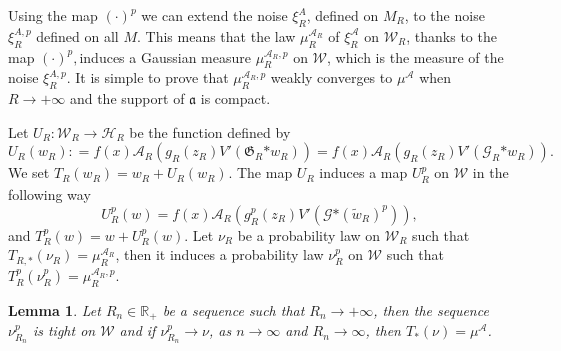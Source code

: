 \documentclass[a4paper,10pt]{article}
\newcommand{\asterisk}{\mathord{*}}
\newtheorem{lemma}{Lemma}
\begin{document}
Using the map $(\cdot)^p$ we can extend the noise $\xi^A_R$, defined on
$M_R$, to the noise $\xi^{A, p}_R$ defined on all $M$. This means that the law
$\mu^{\mathcal{A}_R}_R$ of $\xi^{\mathcal{A}}_R$ on $\mathcal{W}_R$, thanks to
the map $(\cdot)^p,$induces a Gaussian measure $\mu^{\mathcal{A}_R, p}_R$ on
$\mathcal{W}$, which is the measure of the noise $\xi^{A, p}_R$. It is simple
to prove that $\mu^{\mathcal{A}_R, p}_R$ weakly converges to
$\mu^{\mathcal{A}}$ when $R \rightarrow + \infty$ and the support of
$\mathfrak{a}$ is compact.

Let $U_R : \mathcal{W}_R \rightarrow \mathcal{H}_R$ be the function defined
by
\[ U_R (w_R) : = f (x) \mathcal{A}_R (g_R (z_R) V' (\mathfrak{G}_R \asterisk
   w_R)) = f (x) \mathcal{A}_R (g_R (z_R) V' (\mathcal{G}_R \asterisk w_R)) .
\]
We set $T_R (w_R) = w_R + U_R (w_R)_{}$. The map $U_R$ induces a map $U_R^p$
on $\mathcal{W}$ in the following way
\[ U_R^p (w) = f (x) \mathcal{A}_R (g_R^p (z_R) V' (\mathcal{G} \asterisk
   (\tilde{w}_R)^p)), \]
and $T^p_R (w) = w + U^p_R (w)$. Let $\nu_R$ be a probability law on
$\mathcal{W}_R$ such that $T_{R, \asterisk} (\nu_R) = \mu^{\mathcal{A}_R}_R$,
then it induces a probability law $\nu^p_R$ on $\mathcal{W}$ such that $T^p_R
(\nu_R^p) = \mu^{\mathcal{A}_R, p}_R$.

\begin{lemma}
  \label{lemma_extension1}Let $R_n \in \mathbb{R}_+$ be a sequence such that
  $R_n \rightarrow + \infty$, then the sequence $\nu_{R_n}^p$ is tight on
  $\mathcal{W}$ and if $\nu_{R_n}^p \rightarrow \nu$, as $n \rightarrow
  \infty$ and $R_n \rightarrow \infty$, then $T_{\asterisk} (\nu) =
  \mu^{\mathcal{A}}$.
\end{lemma}
\end{document}
